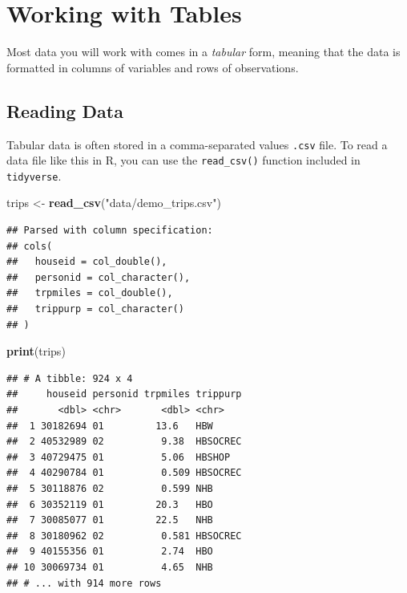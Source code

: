 \documentclass[
]{book}
\newenvironment{Shaded}{\begin{snugshade}}{\end{snugshade}}
\newcommand{\KeywordTok}[1]{\textcolor[rgb]{0.13,0.29,0.53}{\textbf{#1}}}
\newcommand{\NormalTok}[1]{#1}
\newcommand{\StringTok}[1]{\textcolor[rgb]{0.31,0.60,0.02}{#1}}
\begin{document}
\hypertarget{working-with-tables}{%
\section{Working with Tables}\label{working-with-tables}}

Most data you will work with comes in a \emph{tabular} form, meaning that the data
is formatted in columns of variables and rows of observations.

\hypertarget{reading-data}{%
\subsection{Reading Data}\label{reading-data}}

Tabular data is often stored in a comma-separated values \texttt{.csv} file. To read a
data file like this in R, you can use the \texttt{read\_csv()} function included in
\texttt{tidyverse}.

\begin{Shaded}
\begin{Highlighting}[]
\NormalTok{trips <-}\StringTok{ }\KeywordTok{read_csv}\NormalTok{(}\StringTok{"data/demo_trips.csv"}\NormalTok{)}
\end{Highlighting}
\end{Shaded}

\begin{verbatim}
## Parsed with column specification:
## cols(
##   houseid = col_double(),
##   personid = col_character(),
##   trpmiles = col_double(),
##   trippurp = col_character()
## )
\end{verbatim}

\begin{Shaded}
\begin{Highlighting}[]
\KeywordTok{print}\NormalTok{(trips)}
\end{Highlighting}
\end{Shaded}

\begin{verbatim}
## # A tibble: 924 x 4
##     houseid personid trpmiles trippurp
##       <dbl> <chr>       <dbl> <chr>   
##  1 30182694 01         13.6   HBW     
##  2 40532989 02          9.38  HBSOCREC
##  3 40729475 01          5.06  HBSHOP  
##  4 40290784 01          0.509 HBSOCREC
##  5 30118876 02          0.599 NHB     
##  6 30352119 01         20.3   HBO     
##  7 30085077 01         22.5   NHB     
##  8 30180962 02          0.581 HBSOCREC
##  9 40155356 01          2.74  HBO     
## 10 30069734 01          4.65  NHB     
## # ... with 914 more rows
\end{verbatim}
\end{document}
